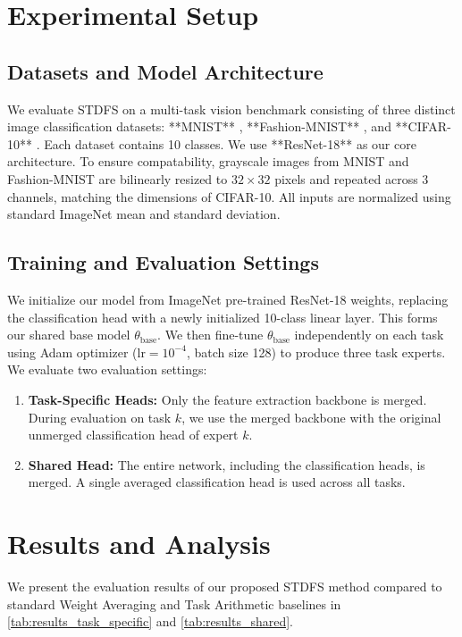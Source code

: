 \documentclass{article}
\theoremstyle{plain}
\theoremstyle{definition}
\theoremstyle{remark}
\begin{document}
\section{Experimental Setup}
\label{sec:setup}
\subsection{Datasets and Model Architecture}
We evaluate STDFS on a multi-task vision benchmark consisting of three distinct image classification datasets: **MNIST** \cite{lecun1998gradient}, **Fashion-MNIST** \cite{xiao2017fashion}, and **CIFAR-10** \cite{krizhevsky2009learning}. Each dataset contains 10 classes. We use **ResNet-18** \cite{he2016deep} as our core architecture. To ensure compatability, grayscale images from MNIST and Fashion-MNIST are bilinearly resized to $32 \times 32$ pixels and repeated across 3 channels, matching the dimensions of CIFAR-10. All inputs are normalized using standard ImageNet mean and standard deviation.

\subsection{Training and Evaluation Settings}
We initialize our model from ImageNet pre-trained ResNet-18 weights, replacing the classification head with a newly initialized 10-class linear layer. This forms our shared base model $\theta_{\text{base}}$. We then fine-tune $\theta_{\text{base}}$ independently on each task using Adam optimizer ($\text{lr} = 10^{-4}$, batch size 128) to produce three task experts. We evaluate two evaluation settings:
\begin{enumerate}\itemsep=1pt \topsep=1pt \parsep=0pt
    \item \textbf{Task-Specific Heads:} Only the feature extraction backbone is merged. During evaluation on task $k$, we use the merged backbone with the original unmerged classification head of expert $k$.
    \item \textbf{Shared Head:} The entire network, including the classification heads, is merged. A single averaged classification head is used across all tasks.
\end{enumerate}

\section{Results and Analysis}
\label{sec:results}

We present the evaluation results of our proposed STDFS method compared to standard Weight Averaging and Task Arithmetic baselines in \cref{tab:results_task_specific} and \cref{tab:results_shared}.
\end{document}
